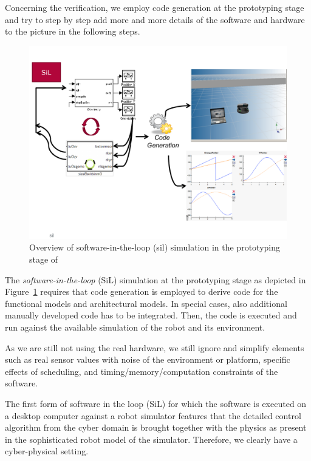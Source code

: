 %
Concerning the verification, we employ code generation at the prototyping stage and try to step by step add more and more details of the software and hardware to the picture in the following steps.

\begin{figure}[!htb]
\centering
\includegraphics[scale=0.33]{figures/sil.pdf}
\caption{Overview of software-in-the-loop (sil) simulation in the prototyping stage of \cite{Broekman&Notenboom2003}}
\label{fig:sil}
\end{figure}



%
The \emph{software-in-the-loop} (SiL) simulation at the prototyping stage as depicted in Figure~\ref{fig:sil} requires that code generation is employed to derive code for the functional models and architectural models. In special cases, also additional manually developed code has to be integrated. Then, the code is executed and run against the available simulation of the robot and its environment.

As we are still not using the real hardware, we still ignore and simplify elements such as real sensor values with noise %
of the environment or platform, specific effects of scheduling, and timing/memory/computation constraints of the software.

%
The first form of software in the loop (SiL) for which the software is executed on a desktop computer against a robot simulator features that the detailed control algorithm from the cyber domain is brought together with the physics as present in the sophisticated robot model of the simulator. Therefore, we clearly have a cyber-physical setting. 

